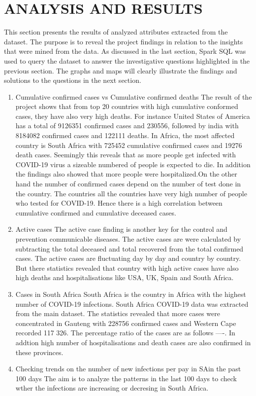 \documentclass[12pt,letterpaper, twoside]{article}
\begin{document}
\section{ANALYSIS AND RESULTS}

This section presents the results of analyzed attributes extracted from the dataset. The purpose is to reveal the project findings  in relation to the insights that were mined from the data. As discussed in the last section, Spark SQL was used to query the dataset to answer the  investigative questions highlighted in the previous section. The graphs and maps will clearly illustrate the findings and solutions to the  questions in the next section.  

\begin{enumerate}
    \item Cumulative confirmed cases vs Cumulative confirmed deaths 
    The result of the project shows that  from top 20 countries with high cumulative conformed cases, they have also very high deaths. For instance United States of America has a total of 9126351 confirmed cases and 230556, followed by india with 8184082 confirmed cases and 122111 deaths. In Africa, the most affected country is South Africa with 725452 cumulative confirmed cases and 19276 death cases. Seemingly this reveals that as more people get infected with COVID-19 virus a sizeable numbered of people is expected to die. In addition the findings also showed that more people were hospitalized.On the other hand the number of confirmed cases depend on the number of test done in the country. The countries all the countries have very high number of people who tested for COVID-19.  Hence there is a high correlation between cumulative confirmed and  cumulative deceased cases. 
    
    \item Active cases
    The active case finding is another key for the control and prevention communicable diseases. The active cases are were calculated by subtracting the total deceased and total recovered from the total confirmed cases. The active cases are fluctuating day by day and country by country.  But  there statistics revealed that country with high active cases have also high deaths and hospitalisations like USA, UK, Spain and South Africa.
    
    \item Cases in South Africa
    South Africa is the country in Africa with the highest number of  COVID-19 infections. South Africa COVID-19 data was extracted from the main dataset. The statistics revealed that more cases were concentrated in Gauteng with 228756 confirmed cases and Western Cape recorded 117 326.  The percentage ratio of the cases are as follows ----. In addtion high  number of hospitalisations and death cases are also confirmed in these provinces. 
    
    
    \item Checking trends on the number of new infections per pay in SAin the past 100 days
    The aim is to analyze the patterns in the last 100 days  to check wther the infections are increasing or decresing in South Africa.
    
    
\end{enumerate}
\end{document}
